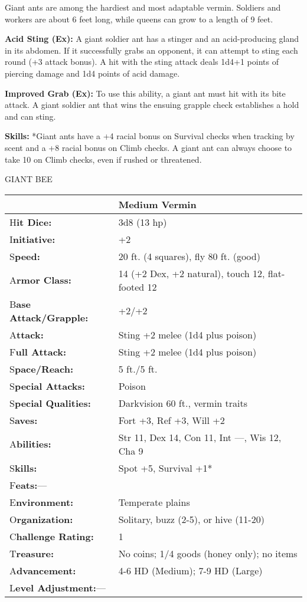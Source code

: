 \documentclass{article}
\begin{document}
Giant ants are among the hardiest and most adaptable vermin. Soldiers and workers 
are about 6 feet long, while queens can grow to a length of 9 feet.

\textbf{Acid Sting (Ex): }A giant soldier ant has a stinger and an acid-producing 
gland in its abdomen. If it successfully grabs an opponent, it can attempt to sting 
each round (+3 attack bonus). A hit with the sting attack deals 1d4+1 points of 
piercing damage and 1d4 points of acid damage.

\textbf{Improved Grab (Ex):} To use this ability, a giant ant must hit with its 
bite attack. A giant soldier ant that wins the ensuing grapple check establishes 
a hold and can sting.

\textbf{Skills:} *Giant ants have a +4 racial bonus on Survival checks when tracking 
by scent and a +8 racial bonus on Climb checks. A giant ant can always choose to 
take 10 on Climb checks, even if rushed or threatened.

\vspace{12pt}
GIANT BEE

\begin{tabular}{|>{\raggedright}p{91pt}|>{\raggedright}p{193pt}|}
\hline
  & Medium Vermin\tabularnewline
\hline
H\textbf{it Dice:} & 3d8 (13 hp)\tabularnewline
\hline
I\textbf{nitiative:} & +2\tabularnewline
\hline
S\textbf{peed:} & 20 ft. (4 squares), fly 80 ft. (good)\tabularnewline
\hline
A\textbf{rmor Class:} & 14 (+2 Dex, +2 natural), touch 12, flat-footed 12\tabularnewline
\hline
B\textbf{ase Attack/Grapple:} & +2/+2\tabularnewline
\hline
A\textbf{ttack:} & Sting +2 melee (1d4 plus poison)\tabularnewline
\hline
F\textbf{ull Attack:} & Sting +2 melee (1d4 plus poison)\tabularnewline
\hline
S\textbf{pace/Reach:} & 5 ft./5 ft.\tabularnewline
\hline
S\textbf{pecial Attacks:} & Poison\tabularnewline
\hline
S\textbf{pecial Qualities:} & Darkvision 60 ft., vermin traits\tabularnewline
\hline
S\textbf{aves:} & Fort +3, Ref +3, Will +2\tabularnewline
\hline
A\textbf{bilities:} & Str 11, Dex 14, Con 11, Int ---, Wis 12, Cha 9\tabularnewline
\hline
S\textbf{kills:} & Spot +5, Survival +1*\tabularnewline
\hline
F\textbf{eats:}--- & \tabularnewline
\hline
E\textbf{nvironment:} & Temperate plains\tabularnewline
\hline
O\textbf{rganization:} & Solitary, buzz (2-5), or hive (11-20)\tabularnewline
\hline
C\textbf{hallenge Rating:} & 1\tabularnewline
\hline
T\textbf{reasure:} & No coins; 1/4 goods (honey only); no items\tabularnewline
\hline
A\textbf{dvancement:} & 4-6 HD (Medium); 7-9 HD (Large)\tabularnewline
\hline
L\textbf{evel Adjustment:}--- & \tabularnewline
\hline
\end{tabular}
\end{document}
